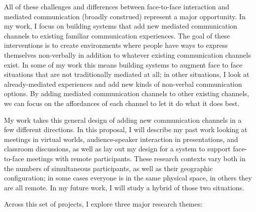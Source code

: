 \documentclass{tufte-handout}
\begin{document}

All of these challenges and differences between face-to-face interaction and  mediated communication (broadly construed) represent a major opportunity. In my work, I focus on building systems that add new mediated communication channels to existing familiar communication experiences. The goal of these interventions is to create environments where people have ways to express themselves non-verbally in addition to whatever existing communication channels exist. In some of my work this means building systems to augment face to face situations that are not traditionally mediated at all; in other situations, I look at already-mediated experiences and add new kinds of non-verbal communication options. By adding mediated communication channels to other existing channels, we can focus on the affordances of each channel to let it do what it does best.


My work takes this general design of adding new communication channels in a few different directions. In this proposal, I will describe my past work looking at meetings in virtual worlds, audience-speaker interaction in presentations, and classroom discussions, as well as lay out my design for a system to support face-to-face meetings with remote participants. These research contexts vary both in the numbers of simultaneous participants, as well as their geographic configuration; in some cases everyone is in the same physical space, in others they are all remote. In my future work, I will study a hybrid of those two situations.

Across this set of projects, I explore three major research themes:
\end{document}
